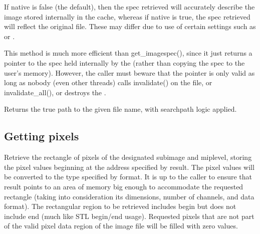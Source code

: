 If {\cf native} is {\cf false} (the default), then the spec retrieved
will accurately describe the image stored internally in the cache,
whereas if {\cf native} is {\cf true}, the spec retrieved will reflect
the original file.  These may differ due to use of certain \ImageCache
settings such as  or .

This method is much more efficient than {\cf get_imagespec()}, since it
just returns a pointer to the spec held internally by the \ImageCache
(rather than copying the spec to the user's memory).  However, the
caller must beware that the pointer is only valid as long as nobody
(even other threads) calls {\cf invalidate()} on the file, or {\cf
  invalidate_all()}, or destroys the \ImageCache.
\apiend

Returns the true path to the given file name, with searchpath logic
applied.
\apiend

\subsection{Getting pixels}
\label{sec:imagecache:api:getpixels}

Retrieve the rectangle of pixels
of the designated {\cf subimage} and {\cf miplevel}, storing the pixel values
beginning at the address specified by result.  The pixel values will be
converted to the type specified by {\cf format}.  It is up to the caller
to ensure that result points to an area of memory big enough to
accommodate the requested rectangle (taking into consideration its
dimensions, number of channels, and data format).
The rectangular region to be retrieved includes {\cf begin} but does not
include {\cf end} (much like STL begin/end usage).
Requested pixels that are not part of the valid pixel data region of the
image file will be filled with zero values.
\apiend

